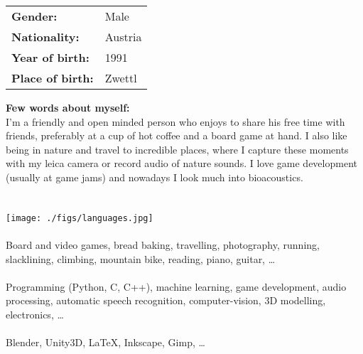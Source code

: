 {


\begin{tabular} { l p{3.9cm} }
  \textbf{Gender:} & Male\\
  \textbf{Nationality:} & Austria\\
  \textbf{Year of birth:} & 1991\\
  \textbf{Place of birth:} & Zwettl\\
\end{tabular}

\textbf{Few words about myself:}\\
I'm a friendly and open minded person who enjoys to share his free time with friends, preferably at a cup of hot coffee and a board game at hand.
I also like being in nature and travel to incredible places, where I capture these moments with my leica camera or record audio of nature sounds. 
I love game development (usually at game jams) and nowadays I look much into bioacoustics.\\


\\\\
\begingroup \centering \texttt{[image: ./figs/languages.jpg]} \endgroup\\



\\
Board and video games, bread baking, travelling, photography, running, slacklining, climbing, mountain bike, reading, piano, guitar, \dots\\


\\
Programming (Python, C, C++), machine learning, game development, audio processing, automatic speech recognition, computer-vision, 3D modelling, electronics, \dots\\


\\
Blender, Unity3D, \LaTeX, Inkscape, Gimp, \dots
}